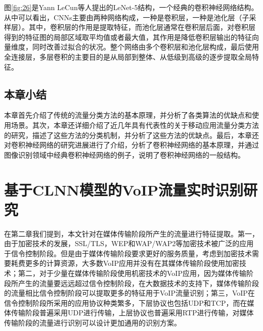 图\ref{fig:26}是Yann LeCun等人提出的LeNet-5结构，一个经典的卷积神经网络结构。从中可以看出，CNNs主要由两种网络构成，一种是卷积层，一种是池化层（子采样层）。其中，卷积层的作用是提取特征，而池化层通常在卷积层后面，对卷积层得到的特征图的局部区域取平均值或者最大值，其作用是降低卷积层输出的特征向量维度，同时改善过拟合的状况。整个网络由多个卷积层和池化层构成，最后使用全连接层，多层卷积的主要目的是从局部到整体、从低级到高级的逐步提取全局特征。



\section{本章小结}

本章首先介绍了传统的流量分类方法的基本原理，并分析了各类算法的优缺点和使用场景。其次，本章还详细介绍了近几年具有代表性的关于移动应用流量分类方法的研究，描述了这些方法的分类机制，并分析了这些方法的优缺点。最后，本章还对卷积神经网络的研究进展进行了介绍，分析了卷积神经网络的基本原理，并通过图像识别领域中经典卷积神经网络的例子，说明了卷积神经网络的一般结构。












\chapter{基于CLNN模型的VoIP流量实时识别研究}
在第二章我们提到，本文针对在媒体传输阶段所产生的流量进行特征提取。第一，由于加密技术的发展，SSL/TLS，WEP和WAP/WAP2等加密技术被广泛的应用于信令控制阶段。但是由于媒体传输阶段要求更好的服务质量，考虑到加密技术需要耗费更多的计算资源，大多数VoIP应用并没有在其媒体传输阶段使用加密技术；第二，对于少量在媒体传输阶段使用机密技术的VoIP应用，因为媒体传输阶段所产生的流量要远远超过信令控制阶段，在大数据技术的支持下，媒体传输阶段的流量相比信令控制阶段可以提取更多的特征用于VoIP流量识别；第三，VoIP在信令控制阶段所采用的应用协议种类繁多，下层协议也包括UDP和TCP，而在媒体传输阶段普遍采用UDP进行传输，上层协议也普遍采用RTP进行传输，对媒体传输阶段的流量进行识别可以设计更加通用的识别方案。



